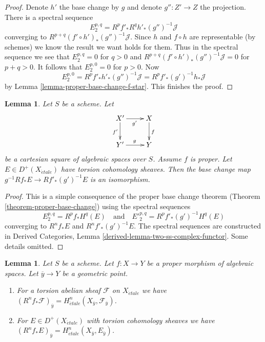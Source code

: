 \documentclass{stacks-project}
\theoremstyle{plain}
\newtheorem{lemma}[subsection]{Lemma}
\theoremstyle{definition}
\theoremstyle{remark}
\numberwithin{equation}{subsection}
\def\etale{{\acute{e}tale}}
\begin{document}
\begin{proof}
\medskip\noindent
Denote $h'$ the base change by $g$ and denote $g'' : Z' \to Z$
the projection. There is a spectral sequence
$$
E_2^{p, q} = R^pf'_* R^qh'_* (g'')^{-1}\mathcal{J}
$$
converging to $R^{p + q}(f' \circ h')_*(g'')^{-1}\mathcal{J}$.
Since $h$ and $f \circ h$ are representable (by schemes)
we know the result we want holds for them. Thus in the
spectral sequence we see that $E_2^{p, q} = 0$ for $q > 0$
and $R^{p + q}(f' \circ h')_*(g'')^{-1}\mathcal{J} = 0$
for $p + q > 0$. It follows that $E_2^{p, 0} = 0$ for $p > 0$.
Now
$$
E_2^{p, 0} = R^pf'_* h'_* (g'')^{-1}\mathcal{J} =
R^pf'_* (g')^{-1}h_*\mathcal{J}
$$
by Lemma \ref{lemma-proper-base-change-f-star}. This finishes the proof.
\end{proof}

\begin{lemma}
\label{lemma-proper-base-change}
Let $S$ be a scheme. Let
$$
\xymatrix{
X' \ar[r]_{g'} \ar[d]_{f'} & X \ar[d]^f \\
Y' \ar[r]^g & Y
}
$$
be a cartesian square of algebraic spaces over $S$. Assume $f$ is proper.
Let $E \in D^+(X_\etale)$ have torsion cohomology sheaves.
Then the base change map $g^{-1}Rf_*E \to Rf'_*(g')^{-1}E$
is an isomorphism.
\end{lemma}

\begin{proof}
This is a simple consequence of the proper base change theorem
(Theorem \ref{theorem-proper-base-change}) using the spectral
sequences
$$
E_2^{p, q} = R^pf_*H^q(E)
\quad\text{and}\quad
{E'}_2^{p, q} = R^pf'_*(g')^{-1}H^q(E)
$$
converging to $R^nf_*E$ and $R^nf'_*(g')^{-1}E$.
The spectral sequences are constructed in
Derived Categories, Lemma \ref{derived-lemma-two-ss-complex-functor}.
Some details omitted.
\end{proof}

\begin{lemma}
\label{lemma-proper-base-change-stalk}
Let $S$ be a scheme.
Let $f : X \to Y$ be a proper morphism of algebraic spaces.
Let $\overline{y} \to Y$ be a geometric point.
\begin{enumerate}
\item For a torsion abelian sheaf $\mathcal{F}$ on $X_\etale$ we have
$(R^nf_*\mathcal{F})_{\overline{y}} =
H^n_\etale(X_{\overline{y}}, \mathcal{F}_{\overline{y}})$.
\item For $E \in D^+(X_\etale)$ with torsion cohomology sheaves we have
$(R^nf_*E)_{\overline{y}} = H^n_\etale(X_{\overline{y}}, E_{\overline{y}})$.
\end{enumerate}
\end{lemma}
\end{document}
